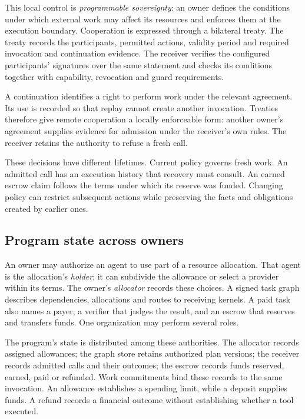 This local control is \emph{programmable sovereignty}: an owner defines the
conditions under which external work may affect its resources and enforces them
at the execution boundary. Cooperation is expressed through a bilateral treaty.
The treaty records the participants, permitted actions, validity period and
required invocation and continuation evidence. The receiver verifies the
configured participants' signatures over the same statement and checks its
conditions together with capability, revocation and guard requirements.

A continuation identifies a right to perform work under the relevant agreement.
Its use is recorded so that replay cannot create another invocation. Treaties
therefore give remote cooperation a locally enforceable form: another owner's
agreement supplies evidence for admission under the receiver's own rules.
The receiver retains the authority to refuse a fresh call.

These decisions have different lifetimes. Current policy governs fresh work.
An admitted call has an execution history that recovery must consult. An earned
escrow claim follows the terms under which its reserve was funded. Changing
policy can restrict subsequent actions while preserving the facts and obligations
created by earlier ones.

\subsection{Program state across owners}
An owner may authorize an agent to use part of a resource allocation. That
agent is the allocation's \emph{holder}; it can subdivide the allowance or
select a provider within its terms. The owner's \emph{allocator} records these
choices. A signed task graph describes dependencies, allocations and routes
to receiving kernels. A paid task also names a payer, a verifier that judges the
result, and an escrow that reserves and transfers funds. One organization may
perform several roles.

The program's state is distributed among these authorities. The allocator
records assigned allowances; the graph store retains authorized plan versions;
the receiver records admitted calls and their outcomes; the escrow records
funds reserved, earned, paid or refunded. Work commitments bind these records
to the same invocation. An allowance establishes a spending limit, while a
deposit supplies funds. A refund records a financial outcome without establishing
whether a tool executed.

